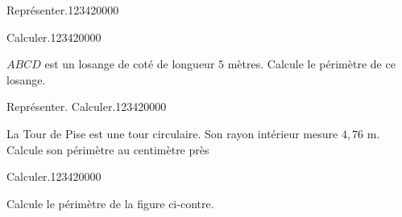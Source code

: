 \begin{pageParcoursu}
\begin{ExoCu}{Représenter.}{1234}{2}{0}{0}{0}{0}
\begin{minipage}{.28\linewidth}
\end{minipage}


\end{ExoCu} 

\begin{ExoCu}{Calculer.}{1234}{2}{0}{0}{0}{0}

\begin{minipage}{.68\linewidth}
 
$ABCD$ est un losange de coté de longueur $5$ mètres. Calcule le périmètre de ce losange.
 

\end{minipage}
 \hfill
\begin{minipage}{.28\linewidth}

  


\end{minipage}



\end{ExoCu} 

\begin{ExoCu}{Représenter. Calculer.}{1234}{2}{0}{0}{0}{0}
 

La Tour de Pise est une tour circulaire. Son rayon intérieur mesure $4,76$ m.
Calcule son périmètre au centimètre près 


\end{ExoCu} 

\begin{ExoCu}{ Calculer.}{1234}{2}{0}{0}{0}{0}
 

\begin{minipage}{.68\linewidth}
 
 Calcule le périmètre de la figure ci-contre.
 

\end{minipage}
\end{ExoCu}
\end{pageParcoursu}
